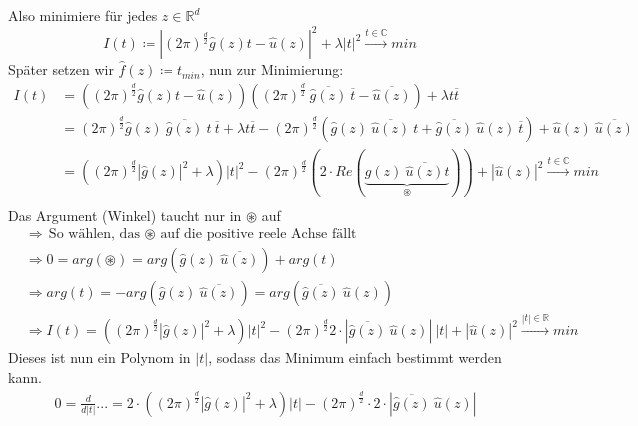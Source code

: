 \documentclass{article}
\theoremstyle{plain}
\theoremstyle{definition}
\numberwithin{equation}{section}
\newcommand{\R}[0] {
\mathbb R
}
\newcommand{\C}[0]{
    \cdot
}
\begin{document}
\begin{enumerate}[label = \arabic*. Ansatz:]
                    Also minimiere für jedes $z \in \R^d$
                    \[I(t) \coloneqq |(2 \pi)^\frac{d}{2} \hat g(z)t - \hat u(z)|^2 + \lambda |t|^2 \overset{t \in \mathbb C}{\longrightarrow}min\]
                    Später setzen wir $\hat f(z) \coloneqq t_{min}$, nun zur Minimierung:
                    \begin{align*}
                        I(t)&=((2 \pi)^\frac{d}{2} \hat g(z) t - \hat u(z))((2 \pi)^\frac{d}{2} \ \overline{\hat g(z)} \ \overline t -\overline{\hat u (z)}) + \lambda t \overline t\\
                        &=(2 \pi)^\frac{d}{2} \hat g(z) \ \overline{\hat g(z)} \ t \ \overline t + \lambda t \overline t - (2 \pi)^\frac{d}{2} (\hat g(z) \ \overline{\hat u(z)} \ t + \overline{\hat g(z)} \ \hat u(z) \ \overline{t}) + \hat u(z) \ \overline{\hat u(z)}\\
                        &=((2 \pi)^\frac{d}{2} |\hat g(z)|^2 + \lambda)|t|^2 - (2 \pi)^\frac{d}{2} (2 \C Re(\underbrace{\hat g(z) \ \overline{\hat u(z)}t}_{\circledast})) + |\hat u(z)|^2 \overset{t \in \mathbb C}{\longrightarrow} min\\
                    \end{align*}
                    Das Argument (Winkel) taucht nur in $\circledast$ auf\\
                    \begin{align*}
                        &\Rightarrow \text{So wählen, das $\circledast$ auf die positive reele Achse fällt}\\
                        &\Rightarrow 0=arg(\circledast)= arg(\hat g(z) \ \overline{\hat u(z)}) + arg(t)\\
                        &\Rightarrow arg(t)=-arg(\hat g(z) \ \overline{\hat u(z)})=arg(\overline{\hat g(z)} \ \hat u(z))\\
                        &\Rightarrow I(t) = ((2\pi)^\frac{d}{2} |\hat g(z)|^2 + \lambda)|t|^2 - (2\pi)^\frac{d}{2} 2 \C |\overline{\hat g(z)} \ \hat u(z)| \ |t| + |\hat u (z)|^2 \overset{|t| \in \R}{\longrightarrow}min
                    \end{align*}
                    Dieses ist nun ein Polynom in $|t|$, sodass das Minimum einfach bestimmt werden kann.\\
                    \begin{align*}
                        &0=\frac{d}{d|t|}...=2\C((2\pi)^\frac{d}{2}|\hat g(z)|^2 + \lambda)|t| - (2\pi)^\frac{d}{2} \C 2 \C |\overline{\hat g(z)} \ \hat u(z)|\\

\end{align*}
\end{enumerate}
\end{document}
